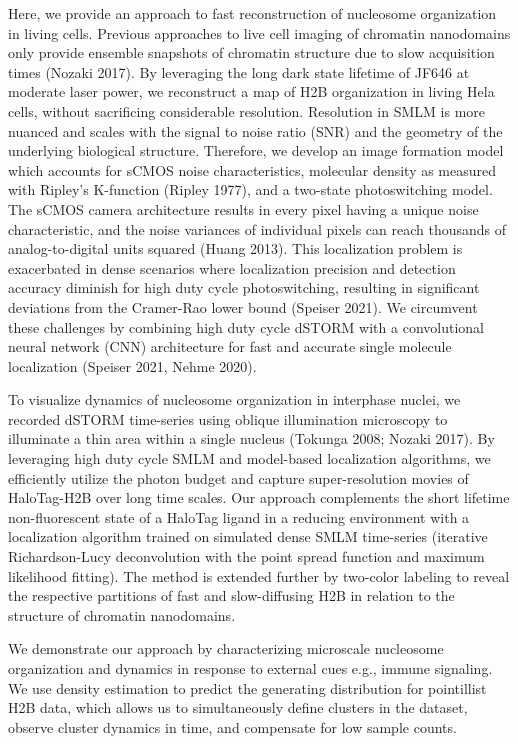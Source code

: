 \documentclass{ucetd}
\begin{document}
Here, we provide an approach to fast reconstruction of nucleosome organization in living cells. Previous approaches to live cell imaging of chromatin nanodomains only provide ensemble snapshots of chromatin structure due to slow acquisition times (Nozaki 2017). By leveraging the long dark state lifetime of JF646 at moderate laser power, we reconstruct a map of H2B organization in living Hela cells, without sacrificing considerable resolution. Resolution in SMLM is more nuanced and scales with the signal to noise ratio (SNR) and the geometry of the underlying biological structure. Therefore, we develop an image formation model which accounts for sCMOS noise characteristics, molecular density as measured with Ripley’s K-function (Ripley 1977), and a two-state photoswitching model. The sCMOS camera architecture results in every pixel having a unique noise characteristic, and the noise variances of individual pixels can reach thousands of analog-to-digital units squared (Huang 2013). This localization problem is exacerbated in dense scenarios where localization precision and detection accuracy diminish for high duty cycle photoswitching, resulting in significant deviations from the Cramer-Rao lower bound (Speiser 2021). We circumvent these challenges by combining high duty cycle dSTORM with a convolutional neural network (CNN) architecture for fast and accurate single molecule localization (Speiser 2021, Nehme 2020). 

To visualize dynamics of nucleosome organization in interphase nuclei, we recorded dSTORM time-series using oblique illumination microscopy to illuminate a thin area within a single nucleus (Tokunga 2008; Nozaki 2017). By leveraging high duty cycle SMLM and model-based localization algorithms, we efficiently utilize the photon budget and capture super-resolution movies of HaloTag-H2B over long time scales. Our approach complements the short lifetime non-fluorescent state of a HaloTag ligand in a reducing environment with a localization algorithm trained on simulated dense SMLM time-series (iterative Richardson-Lucy deconvolution with the point spread function and maximum likelihood fitting). The method is extended further by two-color labeling to reveal the respective partitions of fast and slow-diffusing H2B in relation to the structure of chromatin nanodomains.  

We demonstrate our approach by characterizing microscale nucleosome organization and dynamics in response to external cues e.g., immune signaling. We use density estimation to predict the generating distribution for pointillist H2B data, which allows us to simultaneously define clusters in the dataset, observe cluster dynamics in time, and compensate for low sample counts. 
\end{document}
